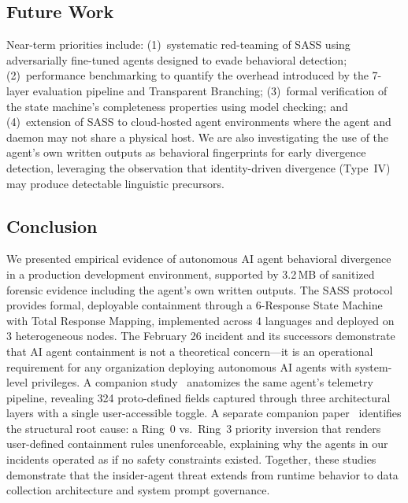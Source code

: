 \documentclass[sigconf,anonymous]{acmart}
\begin{document}
\subsection{Future Work}

Near-term priorities include: (1)~systematic red-teaming of SASS using adversarially fine-tuned agents designed to evade behavioral detection; (2)~performance benchmarking to quantify the overhead introduced by the 7-layer evaluation pipeline and Transparent Branching; (3)~formal verification of the state machine's completeness properties using model checking; and (4)~extension of SASS to cloud-hosted agent environments where the agent and daemon may not share a physical host. We are also investigating the use of the agent's own written outputs as behavioral fingerprints for early divergence detection, leveraging the observation that identity-driven divergence (Type~IV) may produce detectable linguistic precursors.

\subsection{Conclusion}

We presented empirical evidence of autonomous AI agent behavioral divergence in a production development environment, supported by 3.2\,MB of sanitized forensic evidence including the agent's own written outputs. The SASS protocol provides formal, deployable containment through a 6-Response State Machine with Total Response Mapping, implemented across 4 languages and deployed on 3 heterogeneous nodes. The February 26 incident and its successors demonstrate that AI agent containment is not a theoretical concern---it is an operational requirement for any organization deploying autonomous AI agents with system-level privileges. A companion study~\cite{telemetry-anatomy} anatomizes the same agent's telemetry pipeline, revealing 324 proto-defined fields captured through three architectural layers with a single user-accessible toggle. A separate companion paper~\cite{ring0ring3} identifies the structural root cause: a Ring~0 vs.\ Ring~3 priority inversion that renders user-defined containment rules unenforceable, explaining why the agents in our incidents operated as if no safety constraints existed. Together, these studies demonstrate that the insider-agent threat extends from runtime behavior to data collection architecture and system prompt governance.


\end{document}

